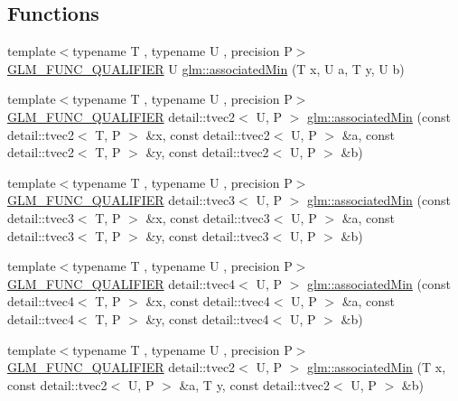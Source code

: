 \subsection*{Functions}
\begin{DoxyCompactItemize}
\item 
{\footnotesize template$<$typename T , typename U , precision P$>$ }\\\hyperlink{setup_8hpp_a33fdea6f91c5f834105f7415e2a64407}{G\+L\+M\+\_\+\+F\+U\+N\+C\+\_\+\+Q\+U\+A\+L\+I\+F\+I\+ER} U \hyperlink{namespaceglm_a8234240191a8aaecdf085f19d41abc5e}{glm\+::associated\+Min} (T x, U a, T y, U b)
\item 
{\footnotesize template$<$typename T , typename U , precision P$>$ }\\\hyperlink{setup_8hpp_a33fdea6f91c5f834105f7415e2a64407}{G\+L\+M\+\_\+\+F\+U\+N\+C\+\_\+\+Q\+U\+A\+L\+I\+F\+I\+ER} detail\+::tvec2$<$ U, P $>$ \hyperlink{namespaceglm_a6f7aa32f2c2628328b04cb06972161ef}{glm\+::associated\+Min} (const detail\+::tvec2$<$ T, P $>$ \&x, const detail\+::tvec2$<$ U, P $>$ \&a, const detail\+::tvec2$<$ T, P $>$ \&y, const detail\+::tvec2$<$ U, P $>$ \&b)
\item 
{\footnotesize template$<$typename T , typename U , precision P$>$ }\\\hyperlink{setup_8hpp_a33fdea6f91c5f834105f7415e2a64407}{G\+L\+M\+\_\+\+F\+U\+N\+C\+\_\+\+Q\+U\+A\+L\+I\+F\+I\+ER} detail\+::tvec3$<$ U, P $>$ \hyperlink{namespaceglm_a72be26bfaf248286d35e8c409432dc7b}{glm\+::associated\+Min} (const detail\+::tvec3$<$ T, P $>$ \&x, const detail\+::tvec3$<$ U, P $>$ \&a, const detail\+::tvec3$<$ T, P $>$ \&y, const detail\+::tvec3$<$ U, P $>$ \&b)
\item 
{\footnotesize template$<$typename T , typename U , precision P$>$ }\\\hyperlink{setup_8hpp_a33fdea6f91c5f834105f7415e2a64407}{G\+L\+M\+\_\+\+F\+U\+N\+C\+\_\+\+Q\+U\+A\+L\+I\+F\+I\+ER} detail\+::tvec4$<$ U, P $>$ \hyperlink{namespaceglm_a320da0e398dd2c7675b8be6755abbcd2}{glm\+::associated\+Min} (const detail\+::tvec4$<$ T, P $>$ \&x, const detail\+::tvec4$<$ U, P $>$ \&a, const detail\+::tvec4$<$ T, P $>$ \&y, const detail\+::tvec4$<$ U, P $>$ \&b)
\item 
{\footnotesize template$<$typename T , typename U , precision P$>$ }\\\hyperlink{setup_8hpp_a33fdea6f91c5f834105f7415e2a64407}{G\+L\+M\+\_\+\+F\+U\+N\+C\+\_\+\+Q\+U\+A\+L\+I\+F\+I\+ER} detail\+::tvec2$<$ U, P $>$ \hyperlink{namespaceglm_a1e99d87b527fe65cc8d972a2284d3f95}{glm\+::associated\+Min} (T x, const detail\+::tvec2$<$ U, P $>$ \&a, T y, const detail\+::tvec2$<$ U, P $>$ \&b)

\end{DoxyCompactItemize}
